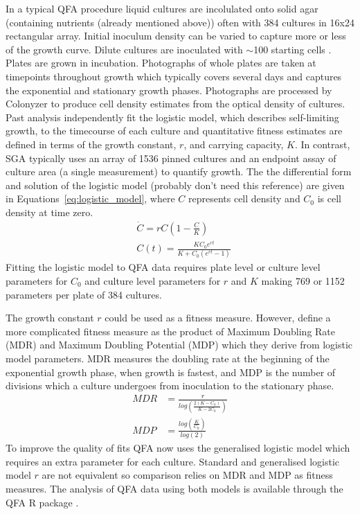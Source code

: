 In a typical QFA procedure liquid cultures are incolulated onto solid
agar (containing nutrients (already mentioned above)) often with 384
cultures in 16x24 rectangular array. Initial inoculum density can be
varied to capture more or less of the growth curve. Dilute cultures
are inoculated with \(\sim\)100 starting cells
\citep{Addinall2011}. Plates are grown in incubation. Photographs of
whole plates are taken at timepoints throughout growth which typically
covers several days and captures the exponential and stationary growth
phases. Photographs are processed by Colonyzer \citep{Lawless2010} to
produce cell density estimates from the optical density of
cultures. Past analysis independently fit the logistic model, which
describes self-limiting growth, to the timecourse of each culture and
quantitative fitness estimates are defined in terms of the growth
constant, \(r\), and carrying capacity, \(K\). In contrast, SGA
typically uses an array of 1536 pinned cultures and an endpoint assay
of culture area (a single measurement) to quantify growth. The the
differential form and solution of the logistic model
\citep{Verhulst1845} (probably don't need this reference) are given in
Equations~\ref{eq:logistic_model}, where \(C\) represents cell density
and \(C_0\) is cell density at time zero.
\begin{subequations}
  \label{eq:logistic_model}
  \begin{align}
    &\dot{C} = rC\left(1 - \frac{C}{K}\right)\\
    &C(t) = \frac{KC_{0}e^{rt}}{K + C_{0}(e^{rt}-1)}
  \end{align}
\end{subequations}
%
Fitting the logistic model to QFA data requires plate level or culture
level parameters for \(C_{0}\) and culture level parameters for \(r\)
and \(K\) making 769 or 1152 parameters per plate of 384 cultures.

The growth constant \(r\) could be used as a fitness measure. However,
\citet{Addinall2011} define a more complicated fitness measure as the
product of Maximum Doubling Rate (MDR) and Maximum Doubling Potential
(MDP) which they derive from logistic model parameters. MDR measures
the doubling rate at the beginning of the exponential growth phase,
when growth is fastest, and MDP is the number of divisions which a
culture undergoes from inoculation to the stationary phase.
%
\begin{subequations}
  \label{eq:MDR_MDP}
    \begin{align}
      MDR &= \frac{r}{log\left(\frac{2(K-C_0)}{K-2C_0}\right)}\\
      MDP &= \frac{log\left(\frac{K}{C_0}\right)}{log(2)}
    \end{align}
\end{subequations}
%
To improve the quality of fits QFA now uses the generalised logistic
model which requires an extra parameter for each culture. Standard and
generalised logistic model \(r\) are not equivalent so comparison
relies on MDR and MDP as fitness measures. The analysis of QFA data
using both models is available through the QFA R package
\citep{qfa2016}.


